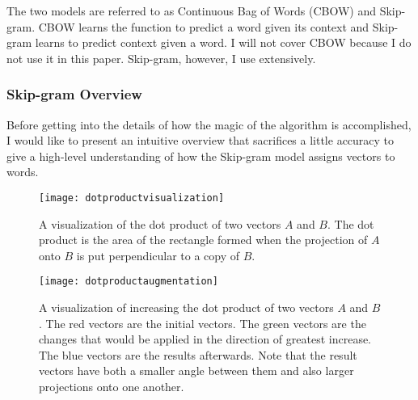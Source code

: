 The two models are referred to as Continuous Bag of Words (CBOW) and 
Skip-gram. CBOW learns the function to predict a word given its context and
Skip-gram learns to predict context given a word. I will not cover CBOW because
I do not use it in this paper. Skip-gram, however, I use extensively. 

\subsubsection{Skip-gram Overview}

Before getting into the details of how the magic of the algorithm is 
accomplished, I would like to present an intuitive overview that sacrifices 
a little accuracy to give a high-level understanding of how the Skip-gram model
assigns vectors to words.

\begin{figure}[tbp]
  \texttt{[image: dotproductvisualization]}
  \caption{A visualization of the dot product of two vectors $A$ and $B$. The 
  dot product is the area of the rectangle formed when the projection of $A$
  onto $B$ is put perpendicular to a copy of $B$.}
  \label{fig:dotproductvisualization}
\end{figure}

\begin{figure}[tbp]
  \texttt{[image: dotproductaugmentation]}
  \caption{A visualization of increasing the dot product of two vectors $A$ and 
  $B$. The red vectors are the initial vectors. The green vectors are the 
  changes that would be applied in the direction of greatest increase. The blue
  vectors are the results afterwards. Note that the result vectors have both a 
  smaller angle between them and also larger projections onto one another.}
  \label{fig:dotproductaugmentation}
\end{figure}

